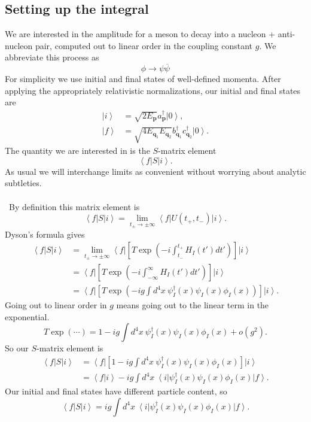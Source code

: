 \documentclass[12 pt]{article}
\newcommand{\KET}[1]{\left| #1 \right\rangle }
\newcommand{\BRA}[1]{\left\langle #1 \right| }
\newcommand{\IP}[2]{\left\langle #1 \left| #2 \right\rangle \right.}
\newcommand{\B}[1]{\mathbf{#1}}
\newcommand{\LP}{\left(}
\newcommand{\RP}{\right)}
\numberwithin{equation}{section}
\begin{document}
\subsection{Setting up the integral}
We are interested in the amplitude for a meson to decay into a nucleon + anti-nucleon pair, computed out to linear order in the coupling constant $g$. We abbreviate this process as \begin{equation*}
\phi \to \psi \overline{\psi}
\end{equation*}
For simplicity we use initial and final states of well-defined momenta. After applying the appropriately relativistic normalizations, our initial and final states are \begin{align*}
\KET{i} & = \sqrt{2 E_\B{p}} a^\dagger _\B{p} \KET{0}, \\
\KET{f} & = \sqrt{4 E_{\B{q}_1} E_{\B{q}_2} } b^\dagger _{\B{q}_1} c^\dagger _{\B{q}_2} \KET{0}.
\end{align*}
The quantity we are interested in is the $S$-matrix element \begin{equation*}
\BRA{f} S \KET{i}.
\end{equation*}
As usual we will interchange limits as convenient without worrying about analytic subtleties.\\
\\
\
By definition this matrix element is \begin{equation*}
\BRA{f} S \KET{i} = \lim _{t_\pm \to \pm \infty} \BRA{f} U(t_+, t_-) \KET{i}.
\end{equation*}
Dyson's formula gives \begin{align*}
\BRA{f} S \KET{i} & = \lim _{t_\pm \to \pm \infty} \BRA{f} \left[   T \exp \LP -i \int _{t_-} ^{t_+} H_I (t') dt' \RP  \right] \KET{i} \\
\ & = \BRA{f} \left[   T \exp \LP -i \int _{-\infty} ^{\infty} H_I (t') dt' \RP  \right] \KET{i} \\
\ & = \BRA{f} \left[ T \exp \LP -i g \int d^4 x \ \psi^\dagger_I (x) \psi_I (x) \phi_I (x) \RP \right] \KET{i}.
\end{align*}
Going out to linear order in $g$ means going out to the linear term in the exponential. \begin{equation*}
T \exp \LP \cdots \RP = 1 - ig \int d^4 x \ \psi^\dagger_I (x) \psi_I (x) \phi_I (x) + o(g^2).
\end{equation*}
So our $S$-matrix element is \begin{align*}
\BRA{f} S \KET{i} & = \BRA{f} \left[ 1 - ig \int d^4 x \ \psi^\dagger_I (x) \psi_I (x) \phi_I (x) \right] \KET{i} \\
\ & = \IP{f}{i} - i g \int d^4 x \ \BRA{i} \psi^\dagger_I (x) \psi_I (x) \phi_I (x) \KET{f}.
\end{align*}
Our initial and final states have different particle content, so \begin{equation*}
\BRA{f} S \KET{i}  = i g \int d^4 x \ \BRA{i} \psi^\dagger_I (x) \psi_I (x) \phi_I (x) \KET{f}.
\end{equation*}
\end{document}
